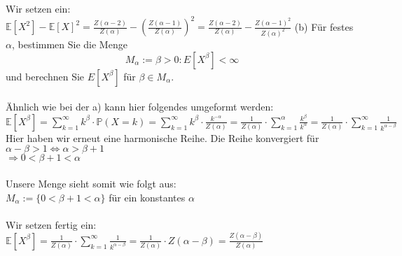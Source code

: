 \documentclass[a4paper]{article}
\begin{document}
Wir setzen ein:\\
$\mathbb{E}[X^2] - \mathbb{E}[X]^2 = \frac{Z(\alpha - 2)}{Z(\alpha)} - \left( \frac{Z(\alpha - 1)}{Z(\alpha)}\right)^2 = \frac{Z(\alpha - 2)}{Z(\alpha)} -\frac{Z(\alpha - 1)^2}{Z(\alpha)^2}$
\clearpage
\noindent (b) Für festes $\alpha$, bestimmen Sie die Menge 
\[M_\alpha := {\beta >0: E[X^\beta] <\infty}\]
und berechnen Sie $E[X^\beta]$ für $\beta \in M_\alpha$.\\\\
Ähnlich wie bei der a) kann hier folgendes umgeformt werden:\\
$\mathbb{E}[X^\beta] = \sum_{k = 1}^\infty k^\beta \cdot \mathbb{P}(X = k) = \sum_{k = 1}^\infty k^\beta \cdot \frac{k^{-\alpha}}{Z(\alpha)} = \frac{1}{Z(\alpha)} \cdot \sum_{k = 1}^\alpha \frac{k^\beta}{k^\alpha} = \frac{1}{Z(\alpha)} \cdot \sum_{k = 1}^\infty \frac{1}{k^{\alpha - \beta}}$\\
Hier haben wir erneut eine harmonische Reihe. Die Reihe konvergiert für $\alpha - \beta > 1 \Leftrightarrow \alpha > \beta + 1$\\
$\Rightarrow 0 < \beta + 1 < \alpha$\\\\
Unsere Menge sieht somit wie folgt aus:\\
$M_\alpha := \{0 < \beta + 1 < \alpha\}$ für ein konstantes $\alpha$\\\\
Wir setzen fertig ein:\\
$\mathbb{E}[X^\beta] = \frac{1}{Z(\alpha)} \cdot \sum_{k = 1}^\infty \frac{1}{k^{\alpha - \beta}} = \frac{1}{Z(\alpha)} \cdot Z(\alpha - \beta) = \frac{Z(\alpha - \beta)}{Z(\alpha)}$\\\\
\end{document}
